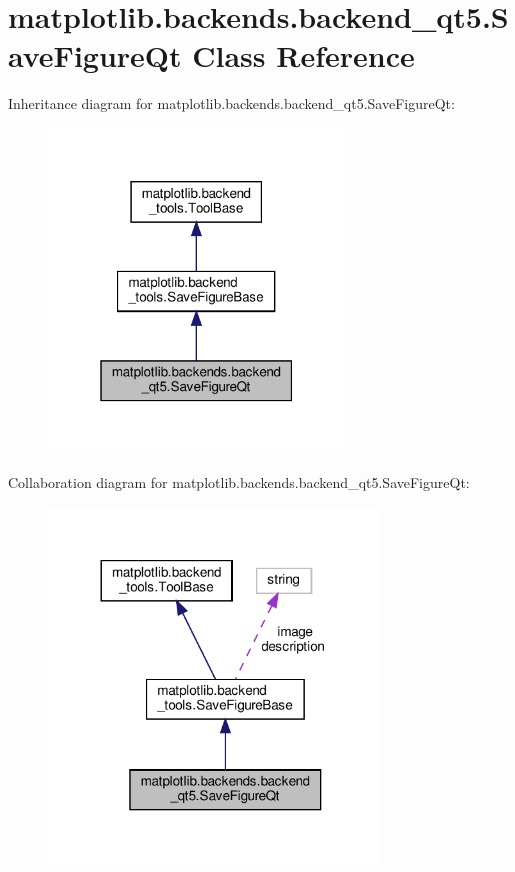 \hypertarget{classmatplotlib_1_1backends_1_1backend__qt5_1_1SaveFigureQt}{}\section{matplotlib.\+backends.\+backend\+\_\+qt5.\+Save\+Figure\+Qt Class Reference}
\label{classmatplotlib_1_1backends_1_1backend__qt5_1_1SaveFigureQt}


Inheritance diagram for matplotlib.\+backends.\+backend\+\_\+qt5.\+Save\+Figure\+Qt\+:
\nopagebreak
\begin{figure}[H]
\begin{center}
\leavevmode
\includegraphics[width=223pt]{classmatplotlib_1_1backends_1_1backend__qt5_1_1SaveFigureQt__inherit__graph}
\end{center}
\end{figure}


Collaboration diagram for matplotlib.\+backends.\+backend\+\_\+qt5.\+Save\+Figure\+Qt\+:
\nopagebreak
\begin{figure}[H]
\begin{center}
\leavevmode
\includegraphics[width=248pt]{classmatplotlib_1_1backends_1_1backend__qt5_1_1SaveFigureQt__coll__graph}
\end{center}
\end{figure}
